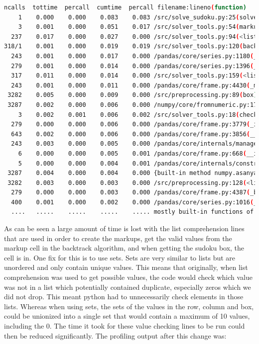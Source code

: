 \documentclass[12pt]{report} %
\begin{document}
\begin{lstlisting}[language=Bash,caption={First profiling output}, basicstyle=\tiny]
ncalls  tottime  percall  cumtime  percall filename:lineno(function)
    1    0.000    0.000    0.083    0.083 /src/solve_sudoku.py:25(solve_sudoku 
    3    0.001    0.000    0.051    0.017 /src/solver_tools.py:54(markup)
  237    0.017    0.000    0.027    0.000 /src/solver_tools.py:94(<listcomp>)
318/1    0.001    0.000    0.019    0.019 /src/solver_tools.py:120(backtrack_alg)
  243    0.001    0.000    0.017    0.000 /pandas/core/series.py:1180(__setitem__) 
  279    0.001    0.000    0.014    0.000 /pandas/core/series.py:1396(_maybe_update_cacher)
  317    0.011    0.000    0.014    0.000 /src/solver_tools.py:159(<listcomp>)
  243    0.001    0.000    0.011    0.000 /pandas/core/frame.py:4430(_maybe_cache_changed)
 3282    0.005    0.000    0.009    0.000 /src/preprocessing.py:89(box) 
 3287    0.002    0.000    0.006    0.000 /numpy/core/fromnumeric.py:1768(ravel)
    3    0.002    0.001    0.006    0.002 /src/solver_tools.py:18(check_sudoku)
  279    0.000    0.000    0.006    0.000 /pandas/core/frame.py:3779(_ixs)
  643    0.002    0.000    0.006    0.000 /pandas/core/frame.py:3856(__getitem__)
  243    0.003    0.000    0.005    0.000 /pandas/core/internals/managers.py:1045(iset)
    6    0.000    0.000    0.005    0.001 /pandas/core/frame.py:668(__init__)
    5    0.000    0.000    0.004    0.001 /pandas/core/internals/construction.py:423(dict_to_mgr)
 3287    0.004    0.000    0.004    0.000 {built-in method numpy.asanyarray}
 3282    0.003    0.000    0.003    0.000 /src/preprocessing.py:128(<listcomp>)
  279    0.000    0.000    0.003    0.000 /pandas/core/frame.py:4387(_box_col_values)
  400    0.001    0.000    0.002    0.000 /pandas/core/series.py:1016(__getitem__)
  ....   .....    .....    .....    ..... mostly built-in functions of packages
\end{lstlisting}

As can be seen a large amount of time is lost with the list comprehension lines that are used in order to create the markups, get the valid values from the markup cell in the backtrack algorithm, and when getting the sudoku box, the cell is in. One fix for this is to use sets. Sets are very similar to lists but are unordered and only contain unique values\cite{freecodecamp_python_set_vs_list}. This means that originally, when list comprehension was used to get possible values, the code would check which value was not in a list which potentially contained duplicate, especially zeros which we did not drop. This meant python had to unnecessarily check elements in those lists. Whereas when using sets, the sets of the values in the row, column and box, could be unionized into a single set that would contain a maximum of 10 values, including the 0. The time it took for these value checking lines to be run could then be reduced significantly. The profiling output after this change was:
\end{document}
